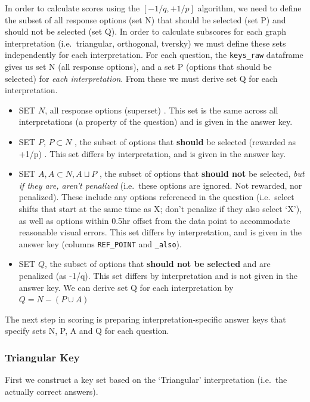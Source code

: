 \documentclass[
  letterpaper,
  DIV=11,
  numbers=noendperiod]{scrreprt}
\begin{document}
In order to calculate scores using the \([-1/q, +1/p]\) algorithm, we
need to define the subset of all response options (set N) that should be
selected (set P) and should not be selected (set Q). In order to
calculate subscores for each graph interpretation (i.e.~triangular,
orthogonal, tversky) we must define these sets independently for each
interpretation. For each question, the \texttt{keys\_raw} dataframe
gives us set N (all response options), and a set P (options that should
be selected) for \emph{each interpretation}. From these we must derive
set Q for each interpretation.

\begin{itemize}
\item
  SET \(N\), all response options (superset) . This set is the same
  across all interpretations (a property of the question) and is given
  in the answer key.
\item
  SET \(P\), \(P \subset N\) , the subset of options that
  \textbf{should} be selected (rewarded as +1/p) . This set differs by
  interpretation, and is given in the answer key.
\item
  SET \(A, A \subset N, A \sqcup P\) , the subset of options that
  \textbf{should not} be selected, \emph{but if they are, aren't
  penalized} (i.e.~these options are ignored. Not rewarded, nor
  penalized). These include any options referenced in the question
  (i.e.~select shifts that start at the same time as X; don't penalize
  if they also select `X'), as well as options within 0.5hr offset from
  the data point to accommodate reasonable visual errors. This set
  differs by interpretation, and is given in the answer key (columns
  \texttt{REF\_POINT} and \texttt{\_also}).
\item
  SET \(Q\), the subset of options that \textbf{should not be selected}
  and are penalized (as -1/q). This set differs by interpretation and is
  not given in the answer key. We can derive set Q for each
  interpretation by \(Q = N - (P \cup A)\)
\end{itemize}

The next step in scoring is preparing interpretation-specific answer
keys that specify sets N, P, A and Q for each question.

\hypertarget{triangular-key}{%
\subsubsection{Triangular Key}\label{triangular-key}}

First we construct a key set based on the `Triangular' interpretation
(i.e.~the actually correct answers).
\end{document}
